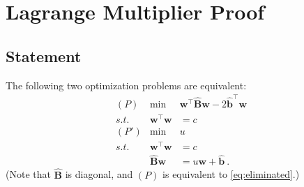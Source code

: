 \documentclass[journal,twoside]{IEEEtran}
\begin{document}
\section{Lagrange Multiplier Proof}\label{sec:lagrange}
\subsection{Statement}
The following two optimization problems are equivalent:
\begin{subequations}
\begin{align}
\nonumber &(P) &\min~ & \mathbf{w}^\top \hat{\mathbf{B}} \mathbf{w} - 2\hat{\mathbf{b}}^\top \mathbf{w} & \\
\nonumber & s.t. & \mathbf{w}^\top \mathbf{w} &= c \\ 
\nonumber &(P') & \min~ & u  \\
\label{eq:Pprime-kkt}& s.t.& \mathbf{w}^\top \mathbf{w} &= c \\
\label{eq:Pprime-norm}&& \hat{\mathbf{B}}\mathbf{w} &= u \mathbf{w} + \hat{\mathbf{b}}~.
\end{align}
\end{subequations}
(Note that $\hat{\mathbf{B}}$ is diagonal, and $(P)$ is equivalent to \eqref{eq:eliminated}.)
\end{document}
